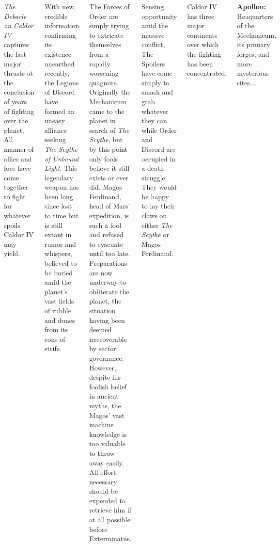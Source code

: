\clearpage
{}

\begin{columns}

  \emph{The Debacle on Caldor IV} captures the last major thrusts at
  the conclusion of years of fighting over the planet.  All manner of
  allies and foes have come together to fight for whatever spoils
  Caldor IV may yield.


  With new, credible information confirming its existence unearthed
  recently, the Legions of Discord have formed an uneasy alliance
  seeking \emph{The Scythe of Unbound Light}.  This legendary weapon
  has been long since lost to time but is still extant in rumor and
  whispers, believed to be buried amid the planet's vast fields of
  rubble and dunes from its eons of strife.

  The Forces of Order are simply trying to extricate themselves from a
  rapidly worsening quagmire.  Originally the Mechanicum came to the
  planet in search of \emph{The Scythe}, but by this point only fools
  believe it still exists or ever did.  Magos Ferdinand, head of Mars'
  expedition, is such a fool and refused to evacuate until too late.
  Preparations are now underway to obliterate the planet, the
  situation having been deemed irrecoverable by sector governance.
  However, despite his foolish belief in ancient myths, the Magos'
  vast machine knowledge is too valuable to throw away easily. All
  effort necessary should be expended to retrieve him if at all
  possible before Exterminatus.

  Sensing opportunity amid the massive conflict, The Spoilers have
  come simply to smash and grab whatever they can while Order and
  Discord are occupied in a death struggle.  They would be happy to
  lay their claws on either \emph{The Scythe} or Magos Ferdinand.



  Caldor IV has three major continents over which the fighting has
  been concentrated:

  \begin{squishitemize}
  \item \textbf{Apollon:} Heaquarters of the Mechanicum, its primary
    forges, and more mysterious sites...


\end{squishitemize}
\end{columns}

